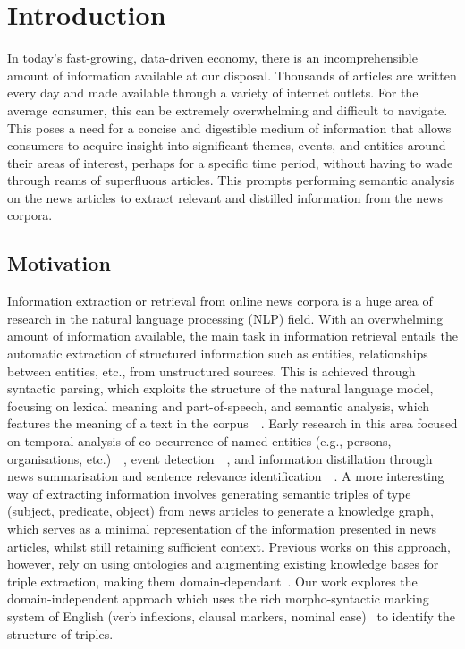 \chapter{Introduction}
\vspace{-2ex}


In today's fast-growing, data-driven economy, there is an incomprehensible amount of information available at our disposal. Thousands of articles are written every day and made available through a variety of internet outlets. For the average consumer, this can be extremely overwhelming and difficult to navigate. This poses a need for a concise and digestible medium of information that allows consumers to acquire insight into significant themes, events, and entities around their areas of interest, perhaps for a specific time period, without having to wade through reams of superfluous articles. This prompts performing semantic analysis on the news articles to extract relevant and distilled information from the news corpora.

\section{Motivation}

Information extraction or retrieval from online news corpora is a huge area of research in the natural language processing (NLP) field. With an overwhelming amount of information available, the main task in information retrieval entails the automatic extraction of structured information such as entities, relationships between entities, etc., from unstructured sources. This is achieved through syntactic parsing, which exploits the structure of the natural language model, focusing on lexical meaning and part-of-speech, and semantic analysis, which features the meaning of a text in the corpus~\cite{global_ents_intro}~\cite{sarawagi_info}. Early research in this area focused on temporal analysis of co-occurrence of named entities (e.g., persons, organisations, etc.)~\cite{sarawagi_info}~\cite{intro_semntic_analysis_news}, event detection~\cite{finance}~\cite{finance_events}, and information distillation through news summarisation and sentence relevance identification~\cite{news_info_extract}~\cite{summary_generation_intro}. A more interesting way of extracting information involves generating semantic triples of type (subject, predicate, object) from news articles to generate a knowledge graph, which serves as a minimal representation of the information presented in news articles, whilst still retaining sufficient context. Previous works on this approach, however, rely on using ontologies and augmenting existing knowledge bases for triple extraction, making them domain-dependant~\cite{wu2020knowledge}. Our work explores the domain-independent approach which uses the rich morpho-syntactic marking system of English (verb inflexions, clausal markers, nominal case)~\cite{tseng2014chinese} to identify the structure of triples.

